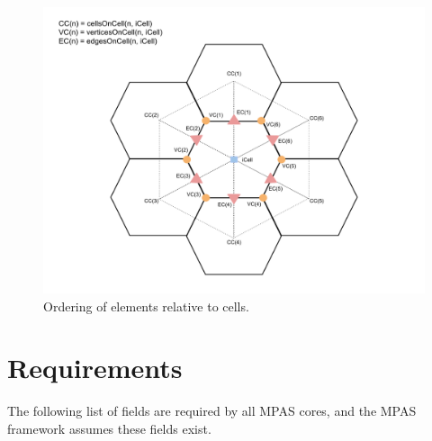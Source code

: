 \documentclass[11pt]{report}
\begin{document}
\begin{figure}
	\centering
	\includegraphics[scale=0.4]{figures/Cell Diagram.pdf}
	\caption{Ordering of elements relative to cells.}
\end{figure}


\chapter{Requirements}

The following list of fields are required by all MPAS cores, and the MPAS framework assumes these fields exist.
\end{document}
